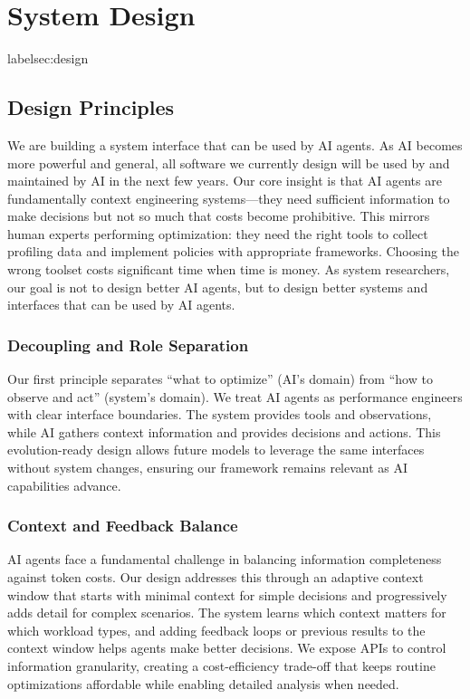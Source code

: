 \section{System Design}
label{sec:design}

\subsection{Design Principles}

We are building a system interface that can be used by AI agents. As AI becomes more powerful and general, all software we currently design will be used by and maintained by AI in the next few years. Our core insight is that AI agents are fundamentally context engineering systems—they need sufficient information to make decisions but not so much that costs become prohibitive. This mirrors human experts performing optimization: they need the right tools to collect profiling data and implement policies with appropriate frameworks. Choosing the wrong toolset costs significant time when time is money. As system researchers, our goal is not to design better AI agents, but to design better systems and interfaces that can be used by AI agents.

\subsubsection{Decoupling and Role Separation}

Our first principle separates ``what to optimize'' (AI's domain) from ``how to observe and act'' (system's domain). We treat AI agents as performance engineers with clear interface boundaries. The system provides tools and observations, while AI gathers context information and provides decisions and actions. This evolution-ready design allows future models to leverage the same interfaces without system changes, ensuring our framework remains relevant as AI capabilities advance.

\subsubsection{Context and Feedback Balance}

AI agents face a fundamental challenge in balancing information completeness against token costs. Our design addresses this through an adaptive context window that starts with minimal context for simple decisions and progressively adds detail for complex scenarios. The system learns which context matters for which workload types, and adding feedback loops or previous results to the context window helps agents make better decisions. We expose APIs to control information granularity, creating a cost-efficiency trade-off that keeps routine optimizations affordable while enabling detailed analysis when needed.

